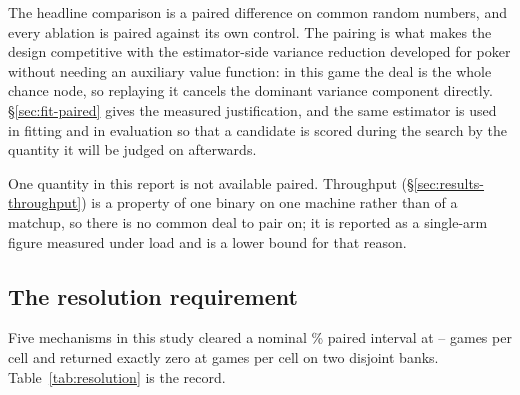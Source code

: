 The headline comparison is a paired difference on common random numbers, and
every ablation is paired against its own control. The pairing is what makes the
design competitive with the estimator-side variance reduction developed for
poker \cite{zinkevich-divat,burch-aivat} without needing an auxiliary value
function: in this game the deal is the whole chance node, so replaying it cancels
the dominant variance component directly. \S\ref{sec:fit-paired} gives the
measured justification, and the same estimator is used in fitting and in
evaluation so that a candidate is scored during the search by the quantity it
will be judged on afterwards.

One quantity in this report is not available paired. Throughput
(\S\ref{sec:results-throughput}) is a property of one binary on one machine
rather than of a matchup, so there is no common deal to pair on; it is reported
as a single-arm figure measured under load and is a lower bound for that reason.

\subsection{The resolution requirement}
\label{sec:protocol-resolution}

Five mechanisms in this study cleared a nominal \vsixBootAlpha{}\% paired
interval at \numResSmallBudgetLo{}--\numResSmallBudgetHi{} games per cell and
returned exactly zero at
\numResLargeBudget{} games per cell on two disjoint banks.
Table~\ref{tab:resolution} is the record.

